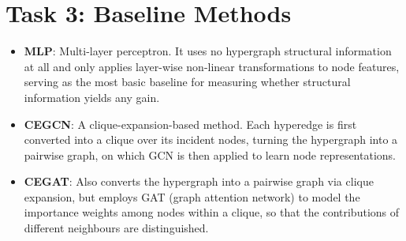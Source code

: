 
\section*{Task 3: Baseline Methods}
\begin{itemize}
    \item \textbf{MLP}: Multi-layer perceptron. It uses no hypergraph structural information at all and only applies layer-wise non-linear transformations to node features, serving as the most basic baseline for measuring whether structural information yields any gain.
    \item \textbf{CEGCN}\cite{chien2022you,zhou2006learning,kipf2017semi}: A clique-expansion-based method. Each hyperedge is first converted into a clique over its incident nodes, turning the hypergraph into a pairwise graph, on which GCN is then applied to learn node representations.
    \item \textbf{CEGAT}\cite{chien2022you,zhou2006learning,velickovic2018graph}: Also converts the hypergraph into a pairwise graph via clique expansion, but employs GAT (graph attention network) to model the importance weights among nodes within a clique, so that the contributions of different neighbours are distinguished.
    
    \vspace{0.5em} %
    

\end{itemize}
